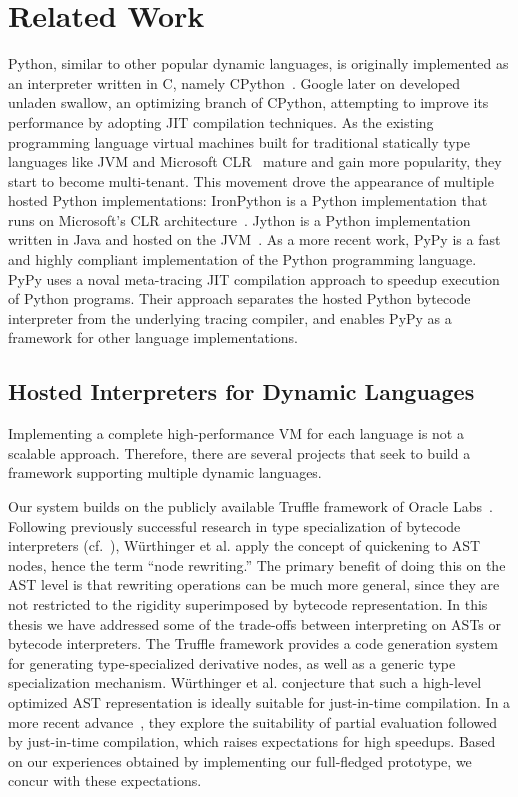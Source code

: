 \chapter{Related Work}
\label{chp:ch8-related-work}

Python, similar to other popular dynamic languages, is originally implemented as an interpreter written in C, namely CPython~\cite{python}.
Google later on developed unladen swallow, an optimizing branch of CPython, attempting to improve its performance by adopting JIT compilation techniques.
As the existing programming language virtual machines built for traditional statically type languages like JVM and Microsoft CLR~\cite{Kennedy+2001,Gough+2001,kilgore2002open} mature and gain more popularity, they start to become multi-tenant.
This movement drove the appearance of multiple hosted Python implementations:
IronPython is a Python implementation that runs on Microsoft's CLR architecture~\cite{hugunin2004ironpython}.
Jython is a Python implementation written in Java and hosted on the JVM~\cite{jython}.
As a more recent work, PyPy\cite{Rigo2006,bolz.etal09,bolz.etal+15} is a fast and highly compliant implementation of the Python programming language.
PyPy uses a noval meta-tracing JIT compilation approach to speedup execution of Python programs.
Their approach separates the hosted Python bytecode interpreter from the underlying tracing compiler, and enables PyPy as a framework for other language implementations.

\section{Hosted Interpreters for Dynamic Languages}

Implementing a complete high-performance VM for each language is not a scalable approach.
Therefore, there are several projects that seek to build a framework supporting multiple dynamic languages.

Our system builds on the publicly available Truffle framework of Oracle Labs~\cite{Wurthinger+12}.
Following previously successful research in type specialization of bytecode interpreters (cf.~\cite{Brunthaler2010inca,Brunthaler2010quickening,williams.etal+10}), W\"{u}rthinger et al. apply the concept of quickening to AST nodes, hence the term ``node rewriting.''
The primary benefit of doing this on the AST level is that rewriting operations can be much more general, since they are not restricted to the rigidity superimposed by bytecode representation.
In this thesis we have addressed some of the trade-offs between interpreting on ASTs or bytecode interpreters.
The Truffle framework provides a code generation system for generating type-specialized derivative nodes, as well as a generic type specialization mechanism.
W\"{u}rthinger et al. conjecture that such a high-level optimized AST representation is ideally suitable for just-in-time compilation.
In a more recent advance~\cite{Wurthinger+13}, they explore the suitability of partial evaluation followed by just-in-time compilation, which raises expectations for high speedups.
Based on our experiences obtained by implementing our full-fledged prototype, we concur with these expectations.

